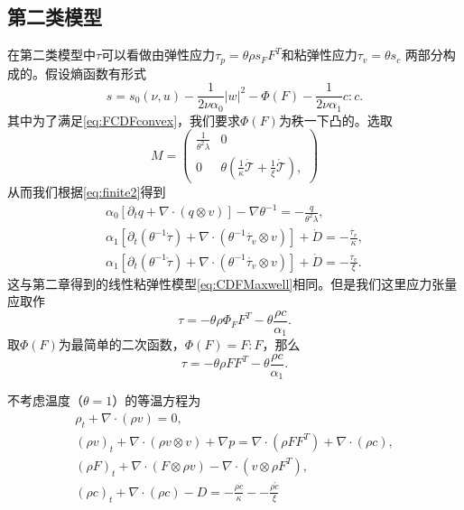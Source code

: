\documentclass{article}
\begin{document}
\subsection{第二类模型}
在第二类模型中$\tau$可以看做由弹性应力$\tau_p = \theta \rho s_F F^T$和粘弹性应力$\tau_v=\theta s_c$
两部分构成的。假设熵函数有形式
\begin{equation*}
 	s = s_0(\nu,u) - \frac{1}{2 \nu \alpha_0} |w|^2 - \Phi (F)  - \frac{1}{2\nu \alpha_1}c:c .
\end{equation*}
其中为了满足\eqref{eq:FCDFconvex}，我们要求$\Phi(F)$为秩一下凸的。选取
\begin{equation*}
	M = \left( \begin{array}{ccc} 
			\frac{1}{\theta^2 \lambda} & 0 \\
			0 &  \theta(\frac{1}{\kappa} \dot{\mathcal{T}} + \frac{1}{\xi} \mathring{\mathcal{T}})  ,
		\end{array} \right)
\end{equation*}
从而我们根据\eqref{eq:finite2}得到
	\begin{subequations}
		\begin{align*}
			\alpha_0 [\partial_t q +  \nabla \cdot (q \otimes v)] - \nabla \theta^{-1} = -\frac{q}{\theta^2 \lambda}, \\
			\alpha_1[\partial_t (\theta^{-1} \dot{\tau}) + \nabla \cdot (\theta^{-1} \dot{\tau_v} \otimes v)] + \dot{D} = -\frac{\dot{\tau_v}}{\kappa}, \\
			\alpha_1[\partial_t (\theta^{-1} \mathring{\tau}) + \nabla \cdot (\theta^{-1} \mathring{\tau_v} \otimes v)] + \mathring{D} = -\frac{\dot{\tau_v}}{\xi}. 
		\end{align*}
	\end{subequations}
这与第二章得到的线性粘弹性模型\eqref{eq:CDFMaxwell}相同。但是我们这里应力张量应取作
\begin{equation*}
	\tau = -\theta \rho \Phi_F F^T - \theta \frac{\rho c}{\alpha_1}.
\end{equation*}
取$\Phi(F)$为最简单的二次函数，$\Phi(F) = F:F$，那么
\begin{equation*}
	\tau = -\theta \rho F F^T - \theta \frac{\rho c}{\alpha_1}.
\end{equation*}

不考虑温度（$\theta=1$）的等温方程为
\begin{subequations}\label{eq:compressibleRelax}
  \begin{align}
  \rho_t + \nabla \cdot (\rho v) = 0, \\
  (\rho v)_t + \nabla \cdot ( \rho v \otimes v) + \nabla p = \nabla \cdot (\rho F F^T) + \nabla \cdot ( \rho c), \\
  (\rho F)_t + \nabla \cdot (F \otimes \rho v) - \nabla \cdot (v \otimes \rho F^T), \\
  (\rho c)_t + \nabla \cdot (\rho c) - D  = -\frac{\rho \dot{c}}{\kappa} - -\frac{\rho \mathring{c}}{\xi}
\end{align}
\end{subequations}







\end{document}
